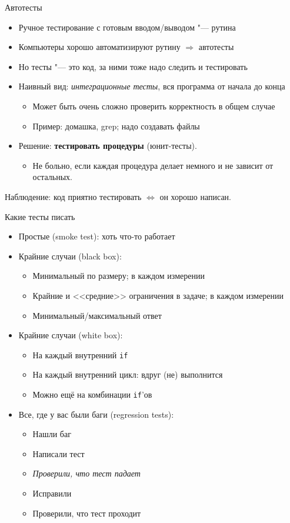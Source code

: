 \begin{frame}[t]{Автотесты}
	\begin{itemize}
	\item Ручное тестирование с готовым вводом/выводом "--- рутина
	\item Компьютеры хорошо автоматизируют рутину $\Rightarrow$ автотесты
	\item Но тесты "--- это код, за ними тоже надо следить и тестировать
	\item Наивный вид: \textit{интеграционные тесты}, вся программа от начала до конца
		\begin{itemize}
		\item Может быть очень сложно проверить корректность в общем случае
		\item Пример: домашка, grep; надо создавать файлы
		\end{itemize}
	\item Решение: \textbf{тестировать процедуры} (юнит-тесты).
		\begin{itemize}
		\item Не больно, если каждая процедура делает немного и не зависит от остальных.
		\end{itemize}
	\end{itemize}
	Наблюдение: код приятно тестировать $\iff$ он хорошо написан.
\end{frame}

\begin{frame}[t]{Какие тесты писать}
	\begin{itemize}
	\item Простые (smoke test): хоть что-то работает
	\item Крайние случаи (black box):
		\begin{itemize}
		\item Минимальный по размеру; в каждом измерении
		\item Крайние и <<средние>> ограничения в задаче; в каждом измерении
		\item Минимальный/максимальный ответ
		\end{itemize}
	\item Крайние случаи (white box):
		\begin{itemize}
		\item На каждый внутренний \texttt{if}
		\item На каждый внутренний цикл: вдруг (не) выполнится
		\item Можно ещё на комбинации \texttt{if}'ов
		\end{itemize}
	\item Все, где у вас были баги (regression tests):
		\begin{itemize}
		\item Нашли баг
		\item Написали тест
		\item \textit{Проверили, что тест падает}
		\item Исправили
		\item Проверили, что тест проходит
		\end{itemize}
	\end{itemize}
\end{frame}

